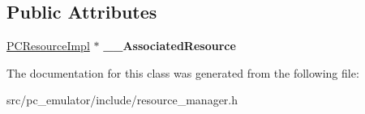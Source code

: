 \subsection*{Public Attributes}
\begin{DoxyCompactItemize}
\item 
\hyperlink{classpc__emulator_1_1PCResourceImpl}{P\+C\+Resource\+Impl} $\ast$ {\bfseries \+\_\+\+\_\+\+Associated\+Resource}\hypertarget{classpc__emulator_1_1ResourceManager_aeeb83ae947725c2758d30ca3e31acea9}{}\label{classpc__emulator_1_1ResourceManager_aeeb83ae947725c2758d30ca3e31acea9}

\end{DoxyCompactItemize}


The documentation for this class was generated from the following file\+:\begin{DoxyCompactItemize}
\item 
src/pc\+\_\+emulator/include/resource\+\_\+manager.\+h\end{DoxyCompactItemize}
